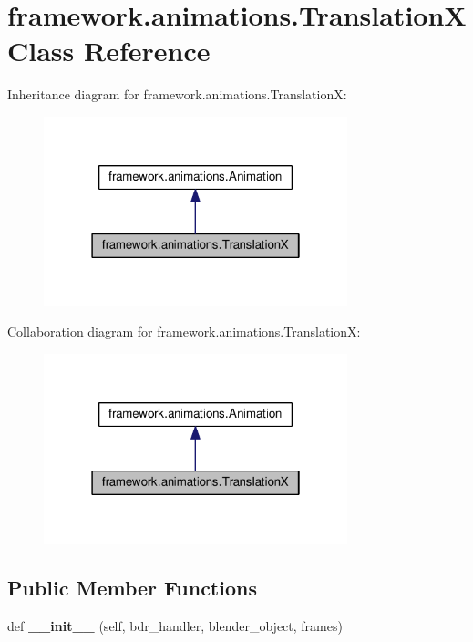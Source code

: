 \hypertarget{classframework_1_1animations_1_1TranslationX}{}\section{framework.\+animations.\+TranslationX Class Reference}
\label{classframework_1_1animations_1_1TranslationX}


Inheritance diagram for framework.\+animations.\+TranslationX\+:
\nopagebreak
\begin{figure}[H]
\begin{center}
\leavevmode
\includegraphics[width=250pt]{classframework_1_1animations_1_1TranslationX__inherit__graph}
\end{center}
\end{figure}


Collaboration diagram for framework.\+animations.\+TranslationX\+:
\nopagebreak
\begin{figure}[H]
\begin{center}
\leavevmode
\includegraphics[width=250pt]{classframework_1_1animations_1_1TranslationX__coll__graph}
\end{center}
\end{figure}
\subsection*{Public Member Functions}
\begin{DoxyCompactItemize}
\item 
def {\bfseries \+\_\+\+\_\+init\+\_\+\+\_\+} (self, bdr\+\_\+handler, blender\+\_\+object, frames)\hypertarget{classframework_1_1animations_1_1TranslationX_a12b85b0228bb4659d43e210ba9acf226}{}\label{classframework_1_1animations_1_1TranslationX_a12b85b0228bb4659d43e210ba9acf226}

\end{DoxyCompactItemize}
